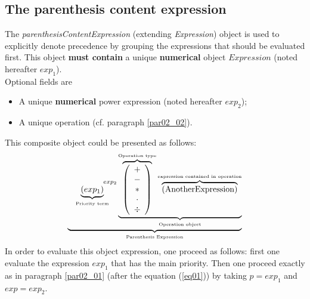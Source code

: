 \documentclass[11pt]{amsart}
\begin{document}
\subsection{The parenthesis content expression}\label{par02_04}
The {\it parenthesisContentExpression} (extending {\it Expression}) object is used to explicitly denote precedence by grouping the expressions that should be evaluated first. This object {\bf must contain} a unique {\bf numerical} object $Expression$ (noted hereafter $exp_1$).\\
Optional fields are 
\begin{itemize}
\item A unique {\bf numerical} power expression (noted hereafter $exp_2$);
\item A unique operation (cf. paragraph \ref{par02_02}).\\
\end{itemize}
This composite object could be presented as follows:
\begin{equation}
 \underbrace{    \underbrace{ \left( exp_1\right) }_{\mbox{\tiny Priority term}} ^{\hspace{15mm}exp_2} \underbrace{  \overbrace{\left( \begin{array}{c} + \\ - \\ \ast  \\ \cdot \\ \div   \end{array} \right) }^{\mbox{\tiny Operation type}}
 \overbrace{    \left( \mbox{AnotherExpression}\right) }^{\mbox{\tiny expression contained in operation}}   }_{\mbox{\tiny Operation object}}}_{\mbox{\tiny Parenthesis Expression}}
\end{equation}
In order to evaluate this object expression, one proceed as follows: first one evaluate the expression $exp_1$ that has the main priority. Then one proceed exactly as in paragraph \ref{par02_01} (after the equation (\ref{eq01})) by taking $p=exp_1$ and $exp=exp_2$.


\end{document}
